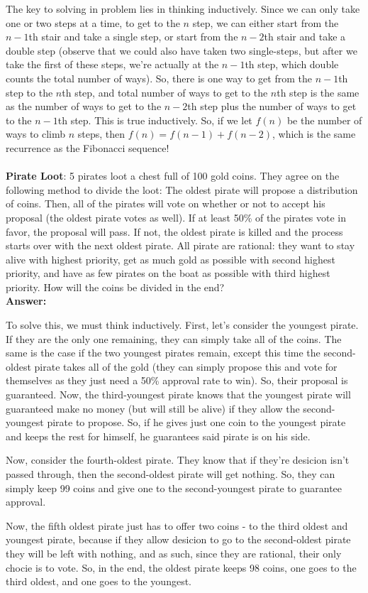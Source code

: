 \documentclass{article}
\begin{document}
The key to solving in problem lies in thinking inductively. Since we can only take one or two steps at a time, to get to the $n$ step, we can either start from the $n-1$th stair and take a single step, or start from the $n-2$th stair and take a double step (observe that we could also have taken two single-steps, but after we take the first of these steps, we're actually at the $n-1$th step, which double counts the total number of ways). So, there is one way to get from the $n-1$th step to the $n$th step, and  total number of ways to get to the $n$th step is the same as the number of ways to get to the $n-2$th step plus the number of ways to get to the $n-1$th step. This is true inductively. So, if we let $f(n)$ be the number of ways to climb $n$ steps, then $f(n) = f(n-1) + f(n-2)$, which is the same recurrence as the Fibonacci sequence!
\\\\
\textbf{Pirate Loot}: 5 pirates loot a chest full of 100 gold coins. They agree on the following method to divide the loot: The oldest pirate will propose a distribution of coins. Then, all of the pirates will vote on whether or not to accept his proposal (the oldest pirate votes as well). If at least 50\% of the pirates vote in favor, the proposal will pass. If not, the oldest pirate is killed and the process starts over with the next oldest pirate. All pirate are rational: they want to stay alive with highest priority, get as much gold as possible with second highest priority, and have as few pirates on the boat as possible with third highest priority. How will the coins be divided in the end?
\\
\textbf{Answer:}

To solve this, we must think inductively. First, let's consider the youngest pirate. If they are the only one remaining, they can simply take all of the coins. The same is the case if the two youngest pirates remain, except this time the second-oldest pirate takes all of the gold (they can simply propose this and vote for themselves as they just need a 50\% approval rate to win). So, their proposal is guaranteed. Now, the third-youngest pirate knows that the youngest pirate will guaranteed make no money (but will still be alive) if they allow the second-youngest pirate to propose. So, if he gives just one coin to the youngest pirate and keeps the rest for himself, he guarantees said pirate is on his side.

Now, consider the fourth-oldest pirate. They know that if they're desicion isn't passed through, then the second-oldest pirate will get nothing. So, they can simply keep 99 coins and give one to the second-youngest pirate to guarantee approval.

Now, the fifth oldest pirate just has to offer two coins - to the third oldest and youngest pirate, because if they allow desicion to go to the second-oldest pirate they will be left with nothing, and as such, since they are rational, their only chocie is to vote. So, in the end, the oldest pirate keeps 98 coins, one goes to the third oldest, and one goes to the youngest.
\end{document}

